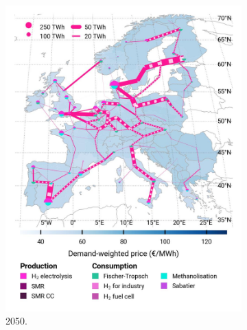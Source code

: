 \documentclass[preprint,12pt,sort&compress]{elsarticle}
\begin{document}
\begin{figure}[htbp]
\begin{subfigure}[t]{0.33\textwidth}
    \includegraphics[width=1\textwidth]{maps/pcipmi-national-international-expansion/base_s_adm___2050-balance_map_H2}
    \caption{ 2050.}
    \label{fig:PCI-in_lt_2050_h2}
  \end{subfigure}
  \begin{subfigure}[t]{0.33\textwidth}
      \vspace{0pt}

\end{subfigure}
\end{figure}
\end{document}

